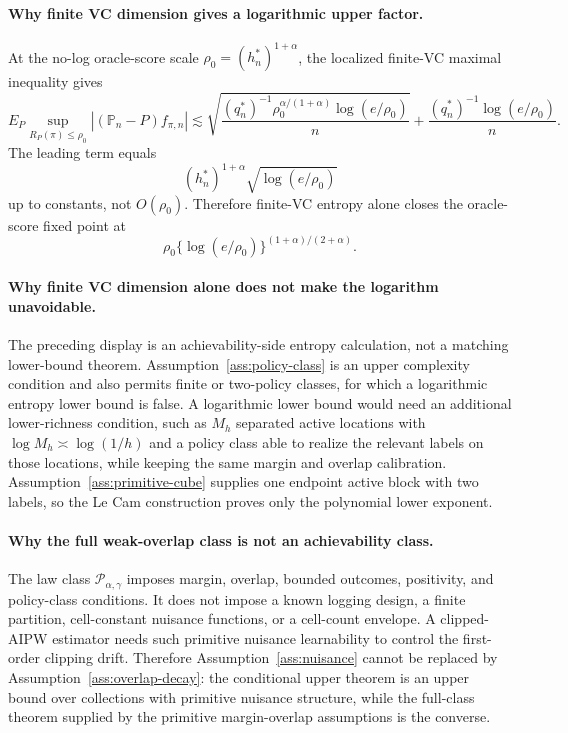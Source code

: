 \documentclass[11pt]{article}
\theoremstyle{definition}
\theoremstyle{plain}
\theoremstyle{remark}
\begin{document}
\paragraph{Why finite VC dimension gives a logarithmic upper factor.}
At the no-log oracle-score scale \(\rho_0=(h_n^*)^{1+\alpha}\), the localized
finite-VC maximal inequality gives
\[
E_P\sup_{R_P(\pi)\le\rho_0}
|(\mathbb P_n-P)f_{\pi,n}|
\lesssim
\sqrt{\frac{(q_n^*)^{-1}\rho_0^{\alpha/(1+\alpha)}
\log(e/\rho_0)}{n}}
+
\frac{(q_n^*)^{-1}\log(e/\rho_0)}{n}.
\]
The leading term equals
\[
(h_n^*)^{1+\alpha}\sqrt{\log(e/\rho_0)}
\]
up to constants, not \(O(\rho_0)\).  Therefore finite-VC entropy alone closes
the oracle-score fixed point at
\[
\rho_0\{\log(e/\rho_0)\}^{(1+\alpha)/(2+\alpha)}.
\]

\paragraph{Why finite VC dimension alone does not make the logarithm unavoidable.}
The preceding display is an achievability-side entropy calculation, not a
matching lower-bound theorem.  Assumption~\ref{ass:policy-class} is an upper
complexity condition and also permits finite or two-policy classes, for which
a logarithmic entropy lower bound is false.  A logarithmic lower bound would
need an additional lower-richness condition, such as \(M_h\) separated active
locations with \(\log M_h\asymp\log(1/h)\) and a policy class able to realize
the relevant labels on those locations, while keeping the same margin and
overlap calibration.  Assumption~\ref{ass:primitive-cube} supplies one
endpoint active block with two labels, so the Le Cam construction proves only
the polynomial lower exponent.

\paragraph{Why the full weak-overlap class is not an achievability class.}
The law class \(\mathcal P_{\alpha,\gamma}\) imposes margin, overlap, bounded
outcomes, positivity, and policy-class conditions.  It does not impose a
known logging design, a finite partition, cell-constant nuisance functions,
or a cell-count envelope.  A clipped-AIPW estimator needs such primitive
nuisance learnability to control the first-order clipping drift.  Therefore
Assumption~\ref{ass:nuisance} cannot be replaced by
Assumption~\ref{ass:overlap-decay}: the conditional upper theorem is an
upper bound over collections with primitive nuisance structure, while the
full-class theorem supplied by the primitive margin-overlap assumptions is
the converse.
\end{document}
